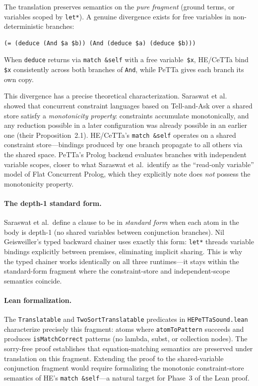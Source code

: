 \documentclass[11pt]{article}
\newcommand{\code}[1]{\texttt{#1}}
\newcommand{\PeTTa}{\textup{PeTTa}}
\newcommand{\HE}{\textup{HE}}
\newcommand{\CeTTa}{\textup{CeTTa}}
\begin{document}
The translation preserves semantics on the \emph{pure fragment}
(ground terms, or variables scoped by \code{let*}).  A genuine
divergence exists for free variables in non-deterministic branches:
\begin{lstlisting}[language={},basicstyle=\ttfamily\scriptsize]
(= (deduce (And $a $b)) (And (deduce $a) (deduce $b)))
\end{lstlisting}
When \code{deduce} returns via \code{match \&self} with a free
variable~\code{\$x}, \HE{}/\CeTTa{} bind \code{\$x} consistently
across both branches of \code{And}, while \PeTTa{} gives each branch
its own copy.

This divergence has a precise theoretical characterization.
Saraswat et al.~\cite{saraswat1988} showed that concurrent constraint
languages based on Tell-and-Ask over a shared store satisfy a
\emph{monotonicity property}: constraints accumulate monotonically,
and any reduction possible in a later configuration was already
possible in an earlier one (their Proposition~2.1).  \HE{}/\CeTTa{}'s
\code{match~\&self} operates on a shared constraint store---bindings
produced by one branch propagate to all others via the shared space.
\PeTTa{}'s Prolog backend evaluates branches with independent variable
scopes, closer to what Saraswat et al.\ identify as the
``read-only variable'' model of Flat Concurrent Prolog, which they
explicitly note does \emph{not} possess the monotonicity property.

\paragraph{The depth-1 standard form.}
Saraswat et al.\ define a clause to be in \emph{standard form} when
each atom in the body is depth-1 (no shared variables between
conjunction branches).  Nil Geisweiller's typed backward chainer
uses exactly this form: \code{let*} threads variable bindings
explicitly between premises, eliminating implicit sharing.  This is
why the typed chainer works identically on all three runtimes---it
stays within the standard-form fragment where the constraint-store
and independent-scope semantics coincide.

\paragraph{Lean formalization.}
The \code{Translatable} and \code{TwoSortTranslatable} predicates in
\code{HEPeTTaSound.lean} characterize precisely this fragment: atoms
where \code{atomToPattern} succeeds and produces
\code{isMatchCorrect} patterns (no lambda, subst, or collection
nodes).  The sorry-free proof establishes that equation-matching
semantics are preserved under translation on this fragment.  Extending
the proof to the shared-variable conjunction fragment would require
formalizing the monotonic constraint-store semantics of \HE{}'s
\code{match~\&self}---a natural target for Phase~3 of the Lean proof.
\end{document}
